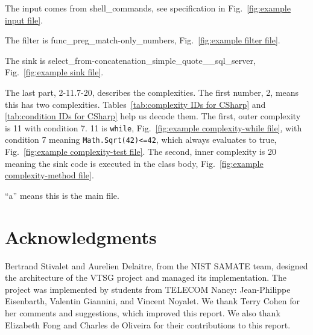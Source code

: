 \documentclass[12pt]{article}
\begin{document}
\noindent The input comes from shell\_commands, see specification in
Fig.~\ref{fig:example input file}.

\noindent The filter is func\_preg\_match-only\_numbers,
Fig.~\ref{fig:example filter file}.

\noindent The sink is select\_from-concatenation\_simple\_quote\_\_sql\_server,
Fig.~\ref{fig:example sink file}.

\noindent The last part, 2-11.7-20, describes the complexities.
The first number, 2, means this has two complexities.
Tables~\ref{tab:complexity IDs for CSharp} and
\ref{tab:condition IDs for CSharp} help us decode them.
The first, outer complexity is 11 with condition 7. 11 is \verb|while|,
Fig.~\ref{fig:example complexity-while file}, 
with condition 7 meaning \verb|Math.Sqrt(42)<=42|, which always evaluates to true,
Fig.~\ref{fig:example complexity-test file}.
The second, inner complexity is 20 meaning the sink code is executed in the class body,
Fig.~\ref{fig:example complexity-method file}.

\noindent ``a'' means this is the main file.



\section{Acknowledgments}

Bertrand Stivalet and Aurelien Delaitre, from the NIST SAMATE team, designed the
architecture of the VTSG project and managed its implementation.  The project was
implemented by students from TELECOM Nancy: Jean-Philippe Eisenbarth, Valentin
Giannini, and Vincent Noyalet.  We thank Terry Cohen for her comments and
suggestions, which improved this report.  We also thank Elizabeth Fong and
Charles de Oliveira for their contributions to this report.
%
%
%
%
\end{document}
